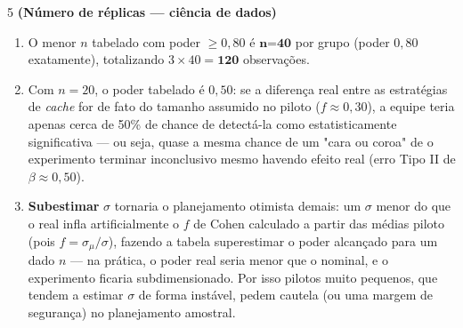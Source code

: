 \documentclass[11pt]{article}
\begin{document}
\begin{questao}{5} \textbf{(Número de réplicas --- ciência de dados)}
\end{questao}
\begin{solucao}
\begin{enumerate}[label=(\alph*)]
  \item O menor $n$ tabelado com poder $\geq 0{,}80$ é $\textbf{n=40}$ por grupo (poder $0{,}80$
    exatamente), totalizando $3\times 40 = \textbf{120}$ observações.
  \item Com $n=20$, o poder tabelado é $0{,}50$: se a diferença real entre as estratégias de
    \emph{cache} for de fato do tamanho assumido no piloto ($f\approx 0{,}30$), a equipe teria
    apenas cerca de 50\% de chance de detectá-la como estatisticamente significativa --- ou seja,
    quase a mesma chance de um "cara ou coroa" de o experimento terminar inconclusivo mesmo
    havendo efeito real (erro Tipo II de $\beta \approx 0{,}50$).
  \item \textbf{Subestimar} $\sigma$ tornaria o planejamento otimista demais: um $\sigma$ menor do
    que o real infla artificialmente o $f$ de Cohen calculado a partir das médias piloto (pois
    $f=\sigma_\mu/\sigma$), fazendo a tabela superestimar o poder alcançado para um dado $n$ --- na
    prática, o poder real seria menor que o nominal, e o experimento ficaria subdimensionado. Por
    isso pilotos muito pequenos, que tendem a estimar $\sigma$ de forma instável, pedem cautela
    (ou uma margem de segurança) no planejamento amostral.
\end{enumerate}
\end{solucao}
\end{document}
